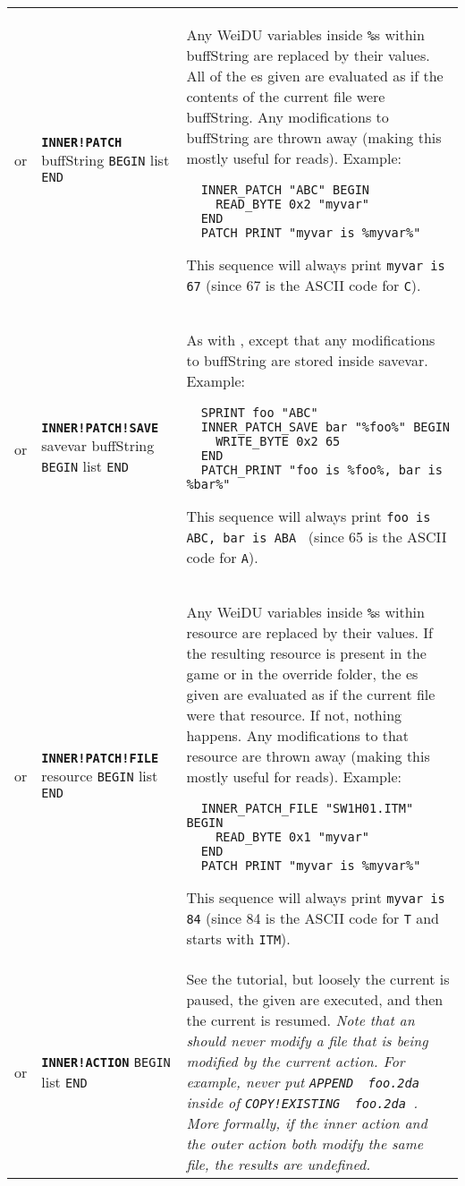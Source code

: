 \documentclass{article}
\def\ttref#1{\ahrefloc{#1}{\tt #1}}
\def\DEFINE#1{{\tt \bf #1}\label{#1}\index{#1}}
\def\DEFSYN#1{{\tt \bf #1}\index{#1}}
\def\t#1{{\tt #1}}
\def\Slist{{\color{red} list }}
\begin{document}
\begin{tabular}{cp{10in}|p{10in}}
or & \DEFINE{INNER!PATCH} buffString \t{BEGIN} \ttref{patch} \Slist \t{END} &
  Any WeiDU variables inside \t{\%}s within buffString are replaced by
  their values. All of the \ttref{patch}es given are evaluated as if the
  contents of the current file were buffString. Any modifications to
  buffString are thrown away (making this mostly useful for reads).
  Example:
  \begin{verbatim}
  INNER_PATCH "ABC" BEGIN
    READ_BYTE 0x2 "myvar"
  END 
  PATCH_PRINT "myvar is %myvar%" 
  \end{verbatim}
  This sequence will always print \t{myvar is 67} (since 67 is the ASCII
  code for \t{C}). \\

or & \DEFINE{INNER!PATCH!SAVE} savevar buffString \t{BEGIN} \ttref{patch} \Slist \t{END} &
  As with \ttref{INNER!PATCH}, except that any modifications to buffString are stored inside
  savevar.
  Example:
  \begin{verbatim}
  SPRINT foo "ABC"
  INNER_PATCH_SAVE bar "%foo%" BEGIN
    WRITE_BYTE 0x2 65
  END
  PATCH_PRINT "foo is %foo%, bar is %bar%"
  \end{verbatim}
  This sequence will always print \t{foo is ABC, bar is ABA } (since 65 is the ASCII
  code for \t{A}). \\


or & \DEFINE{INNER!PATCH!FILE} resource \t{BEGIN} \ttref{patch} \Slist \t{END} &
  Any WeiDU variables inside \t{\%}s within resource are replaced by
  their values. If the resulting resource is present in the game or in the
  override folder, the \ttref{patch}es given are evaluated as if the
  current file were that resource. If not, nothing happens. Any
  modifications to that resource are thrown away (making this mostly useful
  for reads).
  Example:
  \begin{verbatim}
  INNER_PATCH_FILE "SW1H01.ITM" BEGIN
    READ_BYTE 0x1 "myvar"
  END 
  PATCH_PRINT "myvar is %myvar%" 
  \end{verbatim}
  This sequence will always print \t{myvar is 84} (since 84 is the ASCII
  code for \t{T} and \ttref{SW1H01.ITM} starts with \t{ITM}). \\

or & \DEFSYN{INNER!ACTION} \t{BEGIN} \ttref{TP2 Action} \Slist \t{END} & 
  See the \ttref{INNER!ACTION} tutorial, but loosely the current
  \ttref{COPY} is paused, the given \ttref{TP2 Actions} are executed, and
  then the current \ttref{COPY} is resumed. \emph{Note that an
  \ttref{INNER!ACTION} should never modify a file that is being modified by
  the current action. For example, never put \t{APPEND ~foo.2da~} inside of
  \t{COPY!EXISTING ~foo.2da~}. More formally, if the inner action and the
  outer action both modify the same file, the results are undefined.}\\


\end{tabular}
\end{document}
